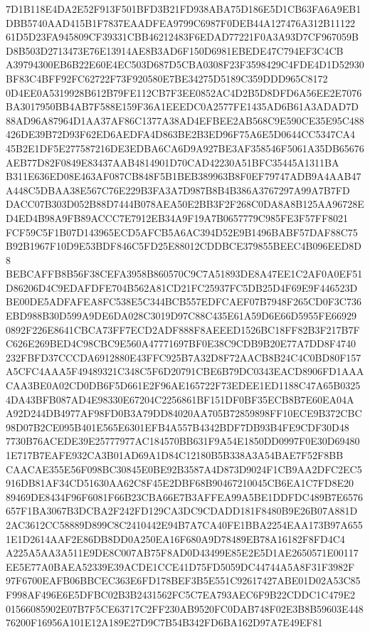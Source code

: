 \documentclass[UTF8,fontset=fandol,zihao=-4,a4paper]{ctexart}
\begin{document}
{{7D1B118E4DA2E52F913F501BFD3B21FD938ABA75D186E5D1CB63FA6A9EB1DBB5740AAD415B1F7837EAADFEA9799C6987F0DEB44A127476A312B11122
61D5D23FA945809CF39331CBB46212483F6EDAD77221F0A3A93D7CF967059BD8B503D2713473E76E13914AE8B3AD6F150D6981EBEDE47C794EF3C4CB
A39794300EB6B22E60E4EC503D687D5CBA0308F23F3598429C4FDE4D1D52930BF83C4BFF92FC62722F73F920580E7BE34275D5189C359DDD965C8172
0D4EE0A5319928B612B79FE112CB7F3EE0852AC4D2B5D8DFD6A56EE2E7076BA3017950BB4AB7F588E159F36A1EEEDC0A2577FE1435AD6B61A3ADAD7D
88AD96A87964D1AA37AF86C1377A38AD4EFBEE2AB568C9E590CE35E95C488426DE39B72D93F62ED6AEDFA4D863BE2B3ED96F75A6E5D0644CC5347CA4
45B2E1DF5E277587216DE3EDBA6CA6D9A927BE3AF358546F5061A35DB65676AEB77D82F0849E83437AAB4814901D70CAD42230A51BFC35445A1311BA
B311E636ED08E463AF087CB848F5B1BEB389963B8F0EF79747ADB9A4AAB47A448C5DBAA38E567C76E229B3FA3A7D987B8B4B386A3767297A99A7B7FD
DACC07B303D052B88D7444B078AEA50E2BB3F2F268C0DA8A8B125AA96728ED4ED4B98A9FB89ACCC7E7912EB34A9F19A7B0657779C985FE3F57FF8021
FCF59C5F1B07D143965ECD5AFCB5A6AC394D52E9B1496BABF57DAF88C75B92B1967F10D9E53BDF846C5FD25E88012CDDBCE379855BEEC4B096EED8D8
BEBCAFFB8B56F38CEFA3958B860570C9C7A51893DE8A47EE1C2AF0A0EF51D86206D4C9EDAFDFE704B562A81CD21FC25937FC5DB25D4F69E9F446523D
BE00DE5ADFAFEA8FC538E5C344BCB557EDFCAEF07B7948F265CD0F3C736EBD988B30D599A9DE6DA028C3019D97C88C435E61A59D6E66D5955FE66929
0892F226E8641CBCA73FF7ECD2ADF888F8AEEED1526BC18FF82B3F217B7FC626E269BED4C98CBC9E560A47771697BF0E38C9CDB9B20E77A7DD8F4740
232FBFD37CCCDA6912880E43FFC925B7A32D8F72AACB8B24C4C0BD80F157A5CFC4AAA5F49489321C348C5F6D20791CBE6B79DC0343EACD8906FD1AAA
CAA3BE0A02CD0DB6F5D661E2F96AE165722F73EDEE1ED1188C47A65B03254DA43BFB087AD4E98330E67204C2256861BF151DF0BF35ECB8B7E60EA04A
A92D244DB4977AF98FD0B3A79DD84020AA705B72859898FF10ECE9B372CBC98D07B2CE095B401E565E6301EFB4A557B4342BDF7DB93B4FE9CDF30D48
7730B76ACEDE39E25777977AC184570BB631F9A54E1850DD0997F0E30D694801E717B7EAFE932CA3B01AD69A1D84C12180B5B338A3A54BAE7F52F8BB
CAACAE355E56F098BC30845E0BE92B3587A4D873D9024F1CB9AA2DFC2EC5916DB81AF34CD51630AA62C8F45E2DBF68B90467210045CB6EA1C7FD8E20
89469DE8434F96F6081F66B23CBA66E7B3AFFEA99A5BE1DDFDC489B7E6576657F1BA3067B3DCBA2F242FD129CA3DC9CDADD181F8480B9E26B07A881D
2AC3612CC58889D899C8C2410442E94B7A7CA40FE1BBA2254EAA173B97A6551E1D2614AAF2E86DB8DD0A250EA16F680A9D78489EB78A16182F8FD4C4
A225A5AA3A511E9DE8C007AB75F8AD0D43499E85E2E5D1AE2650571E00117EE5E77A0BAEA52339E39ACDE1CCE41D75FD5059DC44744A5A8F31F3982F
97F6700EAFB06BBCEC363E6FD178BEF3B5E551C92617427ABE01D02A53C85F998AF496E6E5DFBC02B3B2431562FC5C7EA793AEC6F9B22CDDC1C479E2
01566085902E07B7F5CE63717C2FF230AB9520FC0DAB748F02E3B8B59603E44876200F16956A101E12A189E27D9C7B54B342FD6BA162D97A7E49EF81
}}
\end{document}
